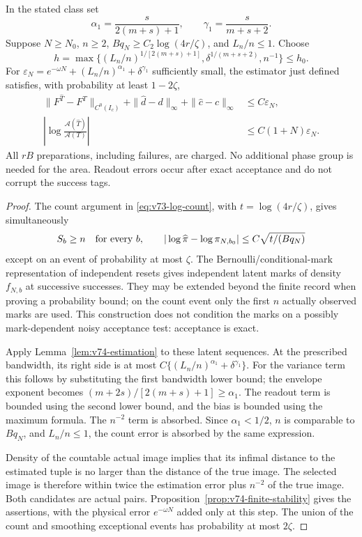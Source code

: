 \begin{theorem}
\label{thm:v74-charged}
In the stated class set
\begin{equation}\label{eq:v74-exponents}
 \alpha_1=\frac{s}{2(m+s)+1},\qquad
 \gamma_1=\frac{s}{m+s+2}.
\end{equation}
Suppose $N\ge N_0$, $n\ge2$, $Bq_N\ge C_2\log(4r/\zeta)$,
and $L_n/n\le1$.  Choose
\[
 h=\max\{(L_n/n)^{1/[2(m+s)+1]},
                      \delta^{1/(m+s+2)},n^{-1}\}\le h_0.
\]
For $\varepsilon_N=e^{-\omega N}+(L_n/n)^{\alpha_1}
+\delta^{\gamma_1}$ sufficiently small, the estimator just defined
satisfies, with probability at least $1-2\zeta$,
\begin{align}
 \|F^{\widehat T}-F^T\|_{C^0(I_c)}
 +\|\widehat d-d\|_\infty+\|\widehat c-c\|_\infty
                 &\le C\varepsilon_N,\label{eq:v74-charged-local}\\
 \left|\log\frac{\mathcal A(\widehat T)}{\mathcal A(T)}\right|
                 &\le C(1+N)\varepsilon_N.
                 \label{eq:v74-charged-area}
\end{align}
All $rB$ preparations, including failures, are charged.  No additional
phase group is needed for the area.  Readout errors occur after exact
acceptance and do not corrupt the success tags.
\end{theorem}
\begin{proof}
The count argument in \eqref{eq:v73-log-count}, with
$t=\log(4r/\zeta)$, gives simultaneously
\[
 S_b\ge n\quad\hbox{for every }b,\qquad
 |\log\widehat\pi-\log\pi_{N,b_0}|
                     \le C\sqrt{t/(Bq_N)}
\]
except on an event of probability at most $\zeta$.  The
Bernoulli/conditional-mark representation of independent resets gives
independent latent marks of density $f_{N,b}$ at successive successes.
They may be extended beyond the finite record when proving a probability
bound; on the count event only the first $n$ actually observed marks
are used.  This construction does not condition the marks on a
possibly mark-dependent noisy acceptance test: acceptance is exact.

Apply Lemma~\ref{lem:v74-estimation} to these latent sequences.
At the prescribed bandwidth, its right side is at most
$C\{(L_n/n)^{\alpha_1}+\delta^{\gamma_1}\}$.
For the variance term this follows by substituting the first bandwidth
lower bound; the envelope exponent becomes
$(m+2s)/[2(m+s)+1]\ge\alpha_1$.  The readout term is bounded using
the second lower bound, and the bias is bounded using the maximum
formula.  The $n^{-2}$ term is absorbed.  Since $\alpha_1<1/2$,
$n$ is comparable to $Bq_N$, and $L_n/n\le1$, the count error is
absorbed by the same expression.

Density of the countable actual image implies that its infimal
distance to the estimated tuple is no larger than the distance of the
true image.  The selected image is therefore within twice the
estimation error plus $n^{-2}$ of the true image.  Both candidates
are actual pairs.  Proposition~\ref{prop:v74-finite-stability}
gives the assertions, with the physical error $e^{-\omega N}$ added
only at this step.  The union of the count and smoothing exceptional
events has probability at most $2\zeta$.
\end{proof}

